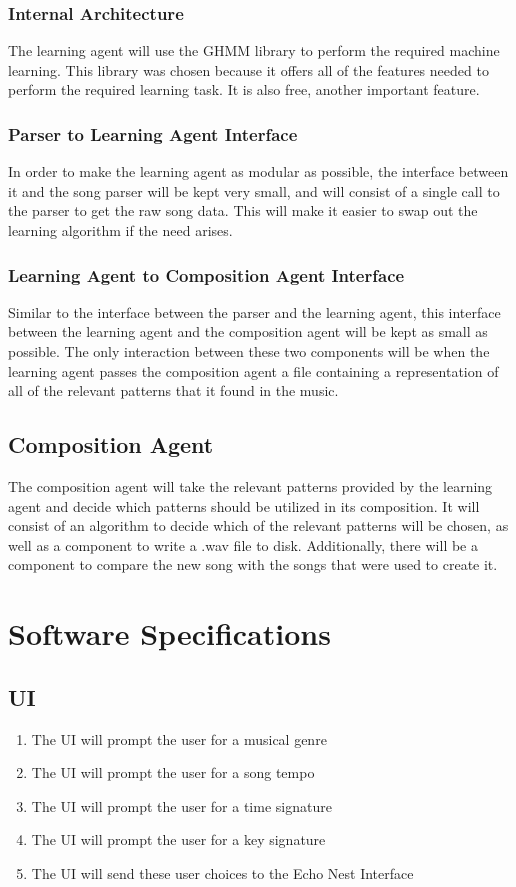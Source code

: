 \documentclass{article}
\begin{document}
\subsubsection{Internal Architecture}
The learning agent will use the GHMM library \cite{GHMM} to perform the required machine learning. This library was chosen because it offers all of the features needed to perform the required learning task. It is also free, another important feature.

\subsubsection{Parser to Learning Agent Interface}
In order to make the learning agent as modular as possible, the interface between it and the song parser will be kept very small, and will consist of a single call to the parser to get the raw song data. This will make it easier to swap out the learning algorithm if the need arises.

\subsubsection{Learning Agent to Composition Agent Interface}
Similar to the interface between the parser and the learning agent, this interface between the learning agent and the composition agent will be kept as small as possible. The only interaction between these two components will be when the learning agent passes the composition agent a file containing a representation of all of the relevant patterns that it found in the music.

\subsection{Composition Agent}
The composition agent will take the relevant patterns provided by the learning agent and decide which patterns should be utilized in its composition. It will consist of an algorithm to decide which of the relevant patterns will be chosen, as well as a component to write a .wav file to disk.  Additionally, there will be a component to compare the new song with the songs that were used to create it.

\section{Software Specifications}
\subsection{UI}
\begin{enumerate}
\item The UI will prompt the user for a musical genre
\item The UI will prompt the user for a song tempo
\item The UI will prompt the user for a time signature
\item The UI will prompt the user for a key signature
\item The UI will send these user choices to the Echo Nest Interface
\end{enumerate}
\end{document}
